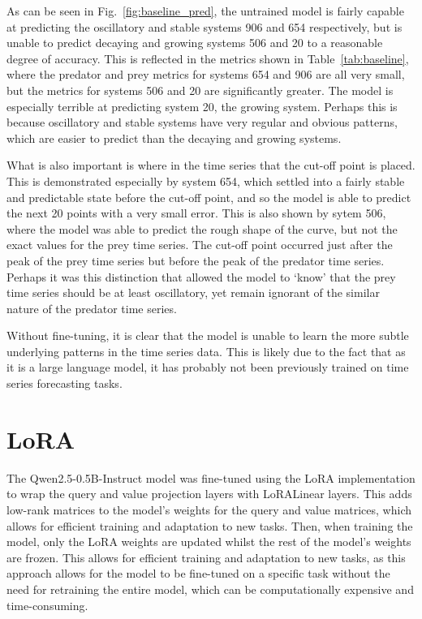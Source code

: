 \documentclass[11pt,a4paper]{article}
\begin{document}
As can be seen in Fig.~\ref{fig:baseline_pred}, the untrained model is fairly capable at predicting the oscillatory and stable systems 906 and 654 respectively, but is unable to predict decaying and growing systems 506 and 20 to a reasonable degree of accuracy. This is reflected in the metrics shown in Table~\ref{tab:baseline}, where the predator and prey metrics for systems 654 and 906 are all very small, but the metrics for systems 506 and 20 are significantly greater. The model is especially terrible at predicting system 20, the growing system. Perhaps this is because oscillatory and stable systems have very regular and obvious patterns, which are easier to predict than the decaying and growing systems. 

What is also important is where in the time series that the cut-off point is placed. This is demonstrated especially by system 654, which settled into a fairly stable and predictable state before the cut-off point, and so the model is able to predict the next 20 points with a very small error. This is also shown by sytem 506, where the model was able to predict the rough shape of the curve, but not the exact values for the prey time series. The cut-off point occurred just after the peak of the prey time series but before the peak of the predator time series. Perhaps it was this distinction that allowed the model to `know' that the prey time series should be at least oscillatory, yet remain ignorant of the similar nature of the predator time series.

Without fine-tuning, it is clear that the model is unable to learn the more subtle underlying patterns in the time series data. This is likely due to the fact that as it is a large language model, it has probably not been previously trained on time series forecasting tasks.
\clearpage
\section{LoRA}
\label{sec:lora}

The Qwen2.5-0.5B-Instruct model was fine-tuned using the LoRA \citep{hu2021loralowrankadaptationlarge} implementation to wrap the query and value projection layers with LoRALinear layers. This adds low-rank matrices to the model's weights for the query and value matrices, which allows for efficient training and adaptation to new tasks. Then, when training the model, only the LoRA weights are updated whilst the rest of the model's weights are frozen. This allows for efficient training and adaptation to new tasks, as this approach allows for the model to be fine-tuned on a specific task without the need for retraining the entire model, which can be computationally expensive and time-consuming.
\end{document}
